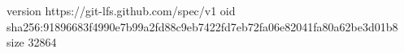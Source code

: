 version https://git-lfs.github.com/spec/v1
oid sha256:91896683f4990e7b99a2fd88c9eb7422fd7eb72fa06e82041fa80a62be3d01b8
size 32864
